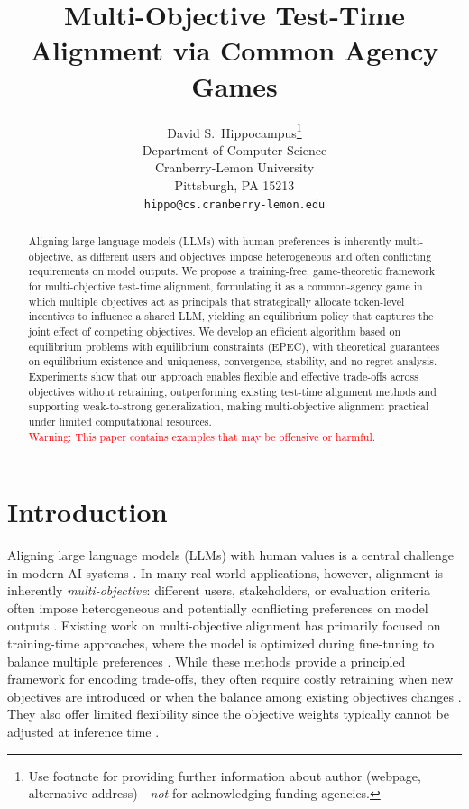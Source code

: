 \documentclass{article}
\title{Multi-Objective Test-Time Alignment via Common Agency Games}
\author{%
  David S.~Hippocampus\thanks{Use footnote for providing further information
    about author (webpage, alternative address)---\emph{not} for acknowledging
    funding agencies.} \\
  Department of Computer Science\\
  Cranberry-Lemon University\\
  Pittsburgh, PA 15213 \\
  \texttt{hippo@cs.cranberry-lemon.edu} \\
}
\begin{document}
\maketitle


\begin{abstract}
Aligning large language models (LLMs) with human preferences is inherently multi-objective, as different users and objectives impose heterogeneous and often conflicting requirements on model outputs. We propose a training-free, game-theoretic framework for multi-objective test-time alignment, formulating it as a common-agency game in which multiple objectives act as principals that strategically allocate token-level incentives to influence a shared LLM, yielding an equilibrium policy that captures the joint effect of competing objectives. We develop an efficient algorithm based on equilibrium problems with equilibrium constraints (EPEC), with theoretical guarantees on equilibrium existence and uniqueness, convergence, stability, and no-regret analysis. Experiments show that our approach enables flexible and effective trade-offs across objectives without retraining, outperforming existing test-time alignment methods and supporting weak-to-strong generalization, making multi-objective alignment practical under limited computational resources.\\
\textcolor{red}{Warning: This paper contains examples that
may be offensive or harmful.}
\end{abstract}

\section{Introduction}
\label{sec:intro}
Aligning large language models (LLMs) with human values is a central challenge in modern AI systems \citep{xiesurvey,casper2023open,bai2022training}. In many real-world applications, however, alignment is inherently \emph{multi-objective}: different users, stakeholders, or evaluation criteria often impose heterogeneous and potentially conflicting preferences on model outputs \citep{li2020deep,vamplew2018human,lin2025parm,xu2024genarm}. Existing work on multi-objective alignment has primarily focused on training-time approaches, where the model is optimized during fine-tuning to balance multiple preferences \citep{li2025gradient,zhangalignment,zhou2024beyond,rame2023rewarded,wang2024arithmetic,guo2024controllable,yang2024rewards}. While these methods provide a principled framework for encoding trade-offs, they often require costly retraining when new objectives are introduced or when the balance among existing objectives changes \citep{lin2025parm,li2025gradient,xu2024genarm}. They also offer limited flexibility since the objective weights typically cannot be adjusted at inference time \citep{li2025multi,lin2025parm}.
\end{document}
